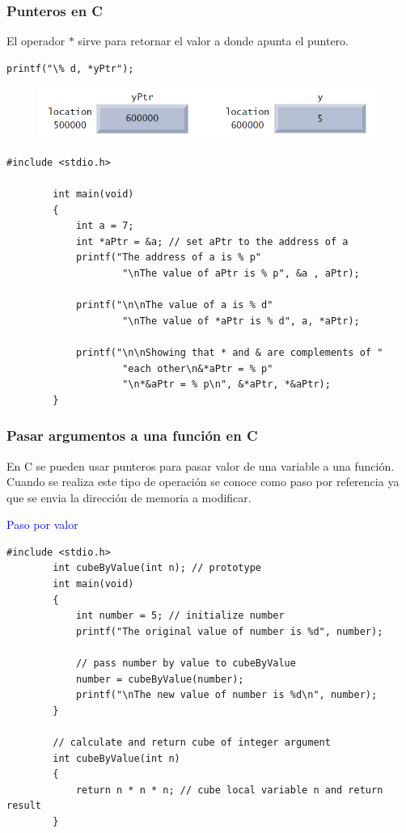 \documentclass[10.5pt,scale=1.0,t,aspectratio=169,hyperref={pdfpagelabels=false}]{beamer}
\begin{document}
\begin{frame}[fragile]
	\frametitle{Punteros en C}
	El operador $*$ sirve para retornar el valor a donde apunta el puntero. 
	\begin{lstlisting}[style=CStyle]
		printf("\% d, *yPtr");
	\end{lstlisting}
	\vspace{-0.3in}
	\begin{figure}
		\centering
		\includegraphics[scale=0.6]{MemoriaPuntero}
	\end{figure}

	\begin{lstlisting}[style=CStyle]
		#include <stdio.h>
		
		int main(void)
		{
			int a = 7;
			int *aPtr = &a; // set aPtr to the address of a
			printf("The address of a is % p"
					"\nThe value of aPtr is % p", &a , aPtr);
			
			printf("\n\nThe value of a is % d"
					"\nThe value of *aPtr is % d", a, *aPtr);
			
			printf("\n\nShowing that * and & are complements of "
					"each other\n&*aPtr = % p"
					"\n*&aPtr = % p\n", &*aPtr, *&aPtr);
		}
	\end{lstlisting}
\end{frame}

\begin{frame}[fragile]
	\frametitle{Pasar argumentos a una función en C}
	En C se pueden usar punteros para pasar valor de una variable a una función. Cuando se realiza este tipo de operación se conoce como paso por referencia ya que se envia la dirección de memoria a modificar. 
	
	\textcolor{blue}{Paso por valor}
	\begin{lstlisting}[style=CStyle]
		#include <stdio.h>
		int cubeByValue(int n); // prototype
		int main(void)
		{
			int number = 5; // initialize number
			printf("The original value of number is %d", number);
			
			// pass number by value to cubeByValue
			number = cubeByValue(number);
			printf("\nThe new value of number is %d\n", number);
		}
		
		// calculate and return cube of integer argument
		int cubeByValue(int n)
		{
			return n * n * n; // cube local variable n and return result
		}
	\end{lstlisting}
\end{frame}
\end{document}
